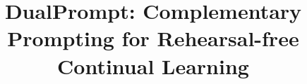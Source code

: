 \documentclass[runningheads]{llncs}
\begin{document}
\pagestyle{headings}
\mainmatter
\def\ECCVSubNumber{5428}  %

\title{DualPrompt: Complementary Prompting for Rehearsal-free Continual Learning} %

\end{document}

